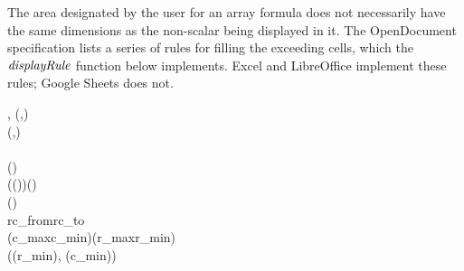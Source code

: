The area designated by the user for an array formula does not necessarily have
the same dimensions as the non-scalar being displayed in it. The OpenDocument
specification lists a series of rules for filling the exceeding cells, which
the \ensuremath{\Varid{displayRule}} function below implements. Excel and LibreOffice implement
these rules; Google Sheets does not.

\begin{hscode}\SaveRestoreHook
{}%
%
%
%
%
%
%
%
%
%
%
%
\>[B]{}\mathbin{::}\llparenthesis \cdot , \cdot \rrparenthesis \to (,)\to {}\to {}\<[E]%
\\
\>[B]{}\;\;(,)\;\mathrel{=}{}\<[E]%
\\
\>[B]{}\<[4]%
\>[4]{}\;\;\<[E]%
\\
\>[4]{}\<[7]%
\>[7]{}\;(\;)\to {}\<[E]%
\\
\>[7]{}\<[10]%
\>[10]{}\;\;\;(\;\;\;(\;\;))\;(\;)\;{}\<[E]%
\\
\>[10]{}\<[22]%
\>[22]{}(\lambda {}\;\to {}\mathbin{\$}\mathbin{!!}\mathbin{!!}){}\<[E]%
\\
\>[4]{}\<[7]%
\>[7]{}\;rc_{from}\;rc_{to}\to {}\<[E]%
\\
\>[7]{}\<[10]%
\>[10]{}\;\;\;(\mathbin{+}c_{max}\mathbin{-}c_{min})\;(\mathbin{+}r_{max}\mathbin{-}r_{min})\;{}\<[E]%
\\
\>[10]{}\<[22]%
\>[22]{}(\lambda {}\;\to {}\;\llparenthesis \langle (r_{min}\mathbin{+})\rangle , \langle (c_{min}\mathbin{+})\rangle \rrparenthesis ){}\<[E]%
\\

\end{hscode}
